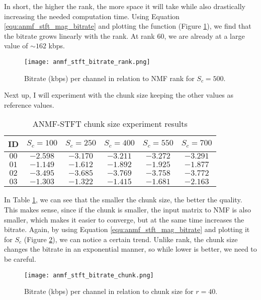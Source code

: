 In short, the higher the rank, the more space it will take while also drastically increasing the needed computation time. Using Equation \ref{equ:anmf_stft_mag_bitrate} and plotting the function (Figure \ref{fig:anmf_stft_bitrate_rank}), we find that the bitrate grows linearly with the rank. At rank 60, we are already at a large value of $\sim162$ kbps.

\begin{figure}[ht]
	\caption[ANMF-STFT rank versus bitrate]{Bitrate (kbps) per channel in relation to NMF rank for $S_c = 500$.}
	\label{fig:anmf_stft_bitrate_rank}
	\centering
	\texttt{[image: anmf\_stft\_bitrate\_rank.png]}
\end{figure}

Next up, I will experiment with the chunk size keeping the other values as reference values.

\begin{table}[htbp]\caption{ANMF-STFT chunk size experiment results}
	\label{tab:anmf_stft_chunk_size}
	\centering
	\begin{tabular}{|c|c|c|c|c|c|}
		\hline
		ID & $S_c=100$ & $S_c=250$ & $S_c=400$ & $S_c=550$ & $S_c=700$ \\ \hline
		$00$ & $-2.598$ & $-3.170$ & $-3.211$ & $-3.272$ & $-3.291$ \\
		$01$ & $-1.149$ & $-1.612$ & $-1.892$ & $-1.925$ & $-1.877$ \\
		$02$ & $-3.495$ & $-3.685$ & $-3.769$ & $-3.758$ & $-3.772$ \\
		$03$ & $-1.303$ & $-1.322$ & $-1.415$ & $-1.681$ & $-2.163$	\\
		\hline
	\end{tabular}
\end{table}

In Table \ref{tab:anmf_stft_chunk_size}, we can see that the smaller the chunk size, the better the quality. This makes sense, since if the chunk is smaller, the input matrix to NMF is also smaller, which makes it easier to converge, but at the same time increases the bitrate. Again, by using Equation \ref{equ:anmf_stft_mag_bitrate} and plotting it for $S_c$ (Figure \ref{fig:anmf_stft_bitrate_chunk}), we can notice a certain trend. Unlike rank, the chunk size changes the bitrate in an exponential manner, so while lower is better, we need to be careful.

\begin{figure}[ht]
	\caption[ANMF-STFT chunk size versus bitrate]{Bitrate (kbps) per channel in relation to chunk size for $r = 40$.}
	\label{fig:anmf_stft_bitrate_chunk}
	\centering
	\texttt{[image: anmf\_stft\_bitrate\_chunk.png]}
\end{figure}

